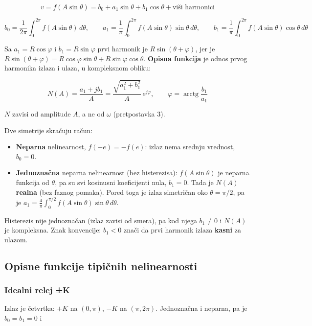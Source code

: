 \documentclass[11pt,a4paper,parskip=half,headsepline,numbers=noenddot]{scrartcl}
\begin{document}
\[v = f(A\sin\theta) = b_0 + a_1\sin\theta + b_1\cos\theta + \text{viši harmonici}\]

\[b_0 = \frac{1}{2\pi}\int_0^{2\pi} f(A\sin\theta)\,d\theta, \qquad a_1 = \frac{1}{\pi}\int_0^{2\pi} f(A\sin\theta)\sin\theta\,d\theta, \qquad b_1 = \frac{1}{\pi}\int_0^{2\pi} f(A\sin\theta)\cos\theta\,d\theta\]

Sa \(a_1 = R\cos\varphi\) i \(b_1 = R\sin\varphi\) prvi harmonik je \(R\sin(\theta + \varphi)\), jer je \(R\sin(\theta + \varphi) = R\cos\varphi\sin\theta + R\sin\varphi\cos\theta\). \textbf{Opisna funkcija} je odnos prvog harmonika izlaza i ulaza, u kompleksnom obliku:

\[N(A) = \frac{a_1 + jb_1}{A} = \frac{\sqrt{a_1^2 + b_1^2}}{A}\,e^{j\varphi}, \qquad \varphi = \operatorname{arctg}\frac{b_1}{a_1}\]

\(N\) zavisi od amplitude \(A\), a ne od \(\omega\) (pretpostavka 3).

Dve simetrije skraćuju račun:

\begin{itemize}
\item \textbf{Neparna} nelinearnost, \(f(-e) = -f(e)\): izlaz nema srednju vrednost, \(b_0 = 0\).
\item \textbf{Jednoznačna} neparna nelinearnost (bez histerezisa): \(f(A\sin\theta)\) je neparna funkcija od \(\theta\), pa su svi kosinusni koeficijenti nula, \(b_1 = 0\). Tada je \(N(A)\) \textbf{realna} (bez faznog pomaka). Pored toga je izlaz simetričan oko \(\theta = \pi/2\), pa je \(a_1 = \frac{4}{\pi}\int_0^{\pi/2} f(A\sin\theta)\sin\theta\,d\theta\).
\end{itemize}

Histerezis nije jednoznačan (izlaz zavisi od smera), pa kod njega \(b_1 \ne 0\) i \(N(A)\) je kompleksna. Znak konvencije: \(b_1 < 0\) znači da prvi harmonik izlaza \textbf{kasni} za ulazom.

\subsection{Opisne funkcije tipičnih nelinearnosti}

\subsubsection{Idealni relej ±K}

Izlaz je četvrtka: \(+K\) na \((0, \pi)\), \(-K\) na \((\pi, 2\pi)\). Jednoznačna i neparna, pa je \(b_0 = b_1 = 0\) i
\end{document}

